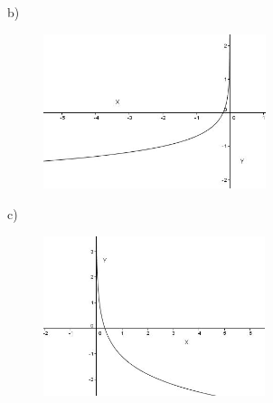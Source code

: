 \documentclass[12pt]{article}
\begin{document}
\begin{enumerate}
\par


\vspace{\baselineskip}
b)\par




\begin{figure}[H]
	\begin{Center}
		\includegraphics[width=2.56in,height=1.78in]{./media/image27.JPG}
	\end{Center}
\end{figure}



\par

c)\par




\begin{figure}[H]
	\begin{Center}
		\includegraphics[width=2.55in,height=1.84in]{./media/image28.JPG}
	\end{Center}
\end{figure}



\par



\end{enumerate}
\end{document}
